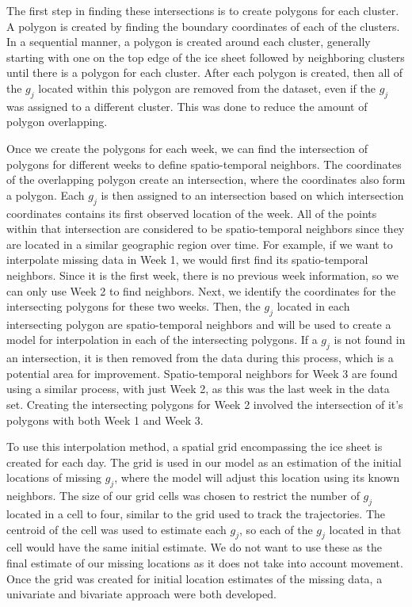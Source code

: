 \documentclass[12pt]{article}
\begin{document}
The first step in finding these intersections is to create polygons for
each cluster. A polygon is created by finding the boundary coordinates
of each of the clusters. In a sequential manner, a polygon is created
around each cluster, generally starting with one on the top edge of the
ice sheet followed by neighboring clusters until there is a polygon for
each cluster. After each polygon is created, then all of the \(g_j\)
located within this polygon are removed from the dataset, even if the
\(g_j\) was assigned to a different cluster. This was done to reduce the
amount of polygon overlapping.

Once we create the polygons for each week, we can find the intersection
of polygons for different weeks to define spatio-temporal neighbors. The
coordinates of the overlapping polygon create an intersection, where the
coordinates also form a polygon. Each \(g_j\) is then assigned to an
intersection based on which intersection coordinates contains its first
observed location of the week. All of the points within that
intersection are considered to be spatio-temporal neighbors since they
are located in a similar geographic region over time. For example, if we
want to interpolate missing data in Week 1, we would first find its
spatio-temporal neighbors. Since it is the first week, there is no
previous week information, so we can only use Week 2 to find neighbors.
Next, we identify the coordinates for the intersecting polygons for
these two weeks. Then, the \(g_j\) located in each intersecting polygon
are spatio-temporal neighbors and will be used to create a model for
interpolation in each of the intersecting polygons. If a \(g_j\) is not
found in an intersection, it is then removed from the data during this
process, which is a potential area for improvement. Spatio-temporal
neighbors for Week 3 are found using a similar process, with just Week
2, as this was the last week in the data set. Creating the intersecting
polygons for Week 2 involved the intersection of it's polygons with both
Week 1 and Week 3.

To use this interpolation method, a spatial grid encompassing the ice
sheet is created for each day. The grid is used in our model as an
estimation of the initial locations of missing \(g_j\), where the model
will adjust this location using its known neighbors. The size of our
grid cells was chosen to restrict the number of \(g_j\) located in a
cell to four, similar to the grid used to track the trajectories. The
centroid of the cell was used to estimate each \(g_j\), so each of the
\(g_j\) located in that cell would have the same initial estimate. We do
not want to use these as the final estimate of our missing locations as
it does not take into account movement. Once the grid was created for
initial location estimates of the missing data, a univariate and
bivariate approach were both developed.
\end{document}
